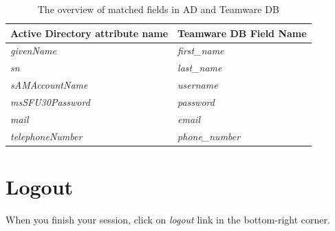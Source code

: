 \begin{table}[ht!]
\vspace{0mm}
\begin{center}
\caption{The overview of matched fields in AD and Teamware DB}
\vspace{2mm}
\small
\label{tab:fields}
\begin{tabular}{ | l | l |}
\hline
\textbf{Active Directory attribute name} &
 \textbf{Teamware DB Field Name} \\ \hline  \hline

\emph{givenName} & \emph{first\_name}\\
\hline
 \emph{sn} & \emph{last\_name}\\
\hline
 \emph{sAMAccountName} & \emph{username}\\
\hline
\emph{msSFU30Password} & \emph{password}\\
\hline
\emph{mail} &    \emph{email}\\
\hline
\emph{telephoneNumber} & \emph{phone\_number}\\
\hline
  \end{tabular}
\normalsize{}
\end{center}
\vspace{-5mm}
\end{table}

\section{Logout}
When you finish your session, click on \emph{logout} link in the bottom-right
corner.